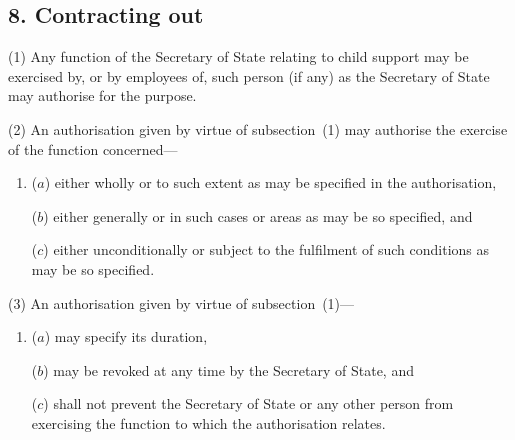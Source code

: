 \documentclass[12pt,a4paper]{article}
\begin{document}
%
%
%
%
%
%

\subsection{8. Contracting out}

(1) Any function of the Secretary of State relating to child support may be exercised by, or by employees of, such person (if any) as the Secretary of State may authorise for the purpose.

(2) An authorisation given by virtue of subsection~(1) may authorise the exercise of the function concerned—
\begin{enumerate}\item[]
($a$) either wholly or to such extent as may be specified in the authorisation,

($b$) either generally or in such cases or areas as may be so specified, and

($c$) either unconditionally or subject to the fulfilment of such conditions as may be so specified.
\end{enumerate}

(3) An authorisation given by virtue of subsection~(1)—
\begin{enumerate}\item[]
($a$) may specify its duration,

($b$) may be revoked at any time by the Secretary of State, and

($c$) shall not prevent the Secretary of State or any other person from exercising the function to which the authorisation relates.
\end{enumerate}
\end{document}

